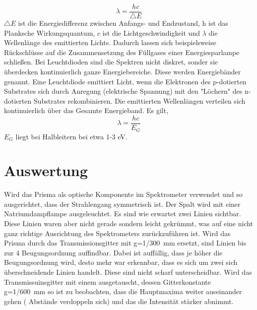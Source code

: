 \begin{equation}
\lambda=\frac{hc}{\triangle E}
\end{equation}
$ \triangle E $ ist die Energiedifferenz zwischen Anfangs- und Endzustand, $ \textit{h} $ ist das Planksche Wirkungsquantum, $ \textit{c} $ ist die Lichtgeschwindigkeit und $ \lambda $ die Wellenlänge des emittierten Lichts. 
Dadurch lassen sich beispielsweise Rückschlüsse auf die Zusammensetzung des Füllgases einer Energiesparlampe schließen.
Bei Leuchtdioden sind die Spektren nicht diskret, sonder sie überdecken kontinuierlich ganze Energiebereiche. Diese werden Energiebänder genannt. 
Eine Leuchtdiode emittiert Licht, wenn die Elektronen des p-dotierten Substrates sich durch Anregung (elektrische Spannung) mit den "Löchern" des n-dotierten Substrates rekombinieren. Die emittierten Wellenlängen verteilen sich kontinuierlich über das Gesamte Energieband. Es gilt,
\begin{equation}
\lambda=\frac{hc}{E_{G}}
\end{equation}
$ E_{G} $ liegt bei Halbleitern bei etwa 1-3 eV.

\newpage
\section{Auswertung}
Wird das Prisma als optische Komponente im Spektrometer verwendet und so ausgerichtet, dass der Strahlengang symmetrisch ist. Der Spalt wird mit einer  Natriumdampflampe ausgeleuchtet. Es sind wie erwartet zwei Linien sichtbar. Diese Linien waren aber nicht gerade sondern leicht gekrümmt, was auf eine nicht ganz richtige Ausrichtung des Spektrometers zurückzuführen ist.
Wird das Prisma durch das Transmissionsgitter mit  g=\SI{1/300}{\milli\meter}  ersetzt, sind Linien bis zur 4 Beugungsordnung auffindbar. Dabei ist auffällig, dass je höher die Beugungsordnung wird, desto mehr war erkennbar, dass es sich um zwei sich überschneidende Linien handelt. Diese sind nicht scharf unterscheidbar.
Wird das Transmissuinsgitter mit einem ausgetauscht, dessen Gitterkonstante  g=\SI{1/600}{\milli\meter}  so ist zu beobachten, dass die Hauptmaxima weiter auseinander gehen ( Abstände verdoppeln sich) und das die Intensität stärker abnimmt.